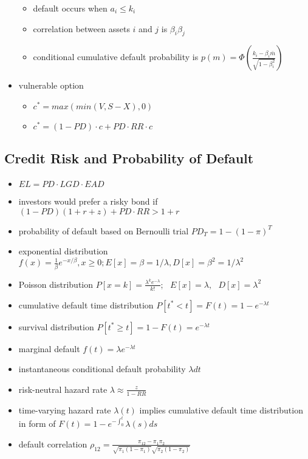 \begin{itemize}
\begin{itemize}
		\item default occurs when $a_i \le k_i$
		\item correlation between assets $i$ and $j$ is $\beta_i \beta_j$
		\item conditional cumulative default probability is $p(m) = \Phi\left(\frac{k_i - \beta_i \bar{m}}{\sqrt{1 - \beta_i^2}}\right)$
	\end{itemize}
	\item vulnerable option
	\begin{itemize}
		\item $c^* = max(min(V, S - X), 0)$
		\item $c^* = (1 - PD) \cdot c + PD \cdot RR \cdot c$
	\end{itemize}
\end{itemize}

\subsection{Credit Risk and Probability of Default}
\begin{itemize}
	\item $EL = PD \cdot LGD \cdot EAD$
	\item investors would prefer a risky bond if $(1 - PD)(1 + r + z) + PD \cdot RR > 1 + r$
	\item probability of default based on Bernoulli trial $PD_T = 1 - (1 - \pi)^T$
	\item exponential distribution $f(x) = \frac{1}{\beta}e^{-x/\beta}, x \ge 0; E[x] = \beta = 1 / \lambda, D[x] = \beta^2 = 1 / \lambda ^ 2$
	\item Poisson distribution $P[x = k] = \frac{\lambda^k e^{-\lambda}}{k!}; ~~~ E[x] = \lambda, ~~~ D[x] = \lambda^2$
	\item cumulative default time distribution $P[t^* < t] = F(t) = 1 - e^{-\lambda t}$
	\item survival distribution $P[t^* \ge t] = 1 - F(t) = e^{-\lambda t}$
	\item marginal default $f(t) = \lambda e^{-\lambda t}$
	\item instantaneous conditional default probability $\lambda dt$
	\item risk-neutral hazard rate $\lambda \approx \frac{z}{1 - RR}$
	\item time-varying hazard rate $\lambda(t)$ implies cumulative default time distribution in form of $F(t) = 1 - e^{-\int_0^t}\lambda(s)ds$
	\item default correlation $\rho_{12} = \frac{\pi_{12} - \pi_1 \pi_2}{\sqrt{\pi_1(1 - \pi_1)}\sqrt{\pi_2(1 - \pi_2)}}$
\end{itemize}

